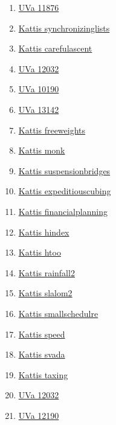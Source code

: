 \begin{enumerate}
\item \href{https://onlinejudge.org/index.php?option=com_onlinejudge&Itemid=8&page=show_problem&problem=2987}{UVa 11876}
\item \href{https://open.kattis.com/problems/synchronizinglists}{Kattis synchronizinglists}
\item \href{https://open.kattis.com/problems/carefulascent}{Kattis carefulascent}
\item \href{https://onlinejudge.org/index.php?option=com_onlinejudge&Itemid=8&page=show_problem&problem=3183}{UVa 12032}
\item \href{https://onlinejudge.org/index.php?option=com_onlinejudge&Itemid=8&page=show_problem&problem=1131}{UVa 10190}
\item \href{https://onlinejudge.org/index.php?option=com_onlinejudge&Itemid=8&page=show_problem&problem=5053}{UVa 13142}
\item \href{https://open.kattis.com/problems/freeweights}{Kattis freeweights}
\item \href{https://open.kattis.com/problems/monk}{Kattis monk}
\item \href{https://open.kattis.com/problems/suspensionbridges}{Kattis suspensionbridges}
\item \href{https://open.kattis.com/problems/expeditiouscubing}{Kattis expeditiouscubing}
\item \href{https://open.kattis.com/problems/financialplanning}{Kattis financialplanning}
\item \href{https://open.kattis.com/problems/hindex}{Kattis hindex}
\item \href{https://open.kattis.com/problems/htoo}{Kattis htoo}
\item \href{https://open.kattis.com/problems/rainfall2}{Kattis rainfall2}
\item \href{https://open.kattis.com/problems/slalom2}{Kattis slalom2}
\item \href{https://open.kattis.com/problems/smallschedulre}{Kattis smallschedulre}
\item \href{https://open.kattis.com/problems/speed}{Kattis speed}
\item \href{https://open.kattis.com/problems/svada}{Kattis svada}
\item \href{https://open.kattis.com/problems/taxing}{Kattis taxing}
\item \href{https://onlinejudge.org/index.php?option=com_onlinejudge&Itemid=8&page=show_problem&problem=3183}{UVa 12032}
\item \href{https://onlinejudge.org/index.php?option=com_onlinejudge&Itemid=8&page=show_problem&problem=3342}{UVa 12190}

\end{enumerate}
